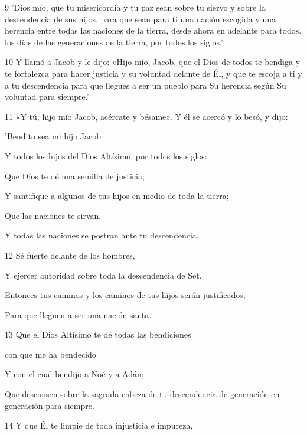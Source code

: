 \par 9 'Dios mío, que tu misericordia y tu paz sean sobre tu siervo y sobre la descendencia de sus hijos, para que sean para ti una nación escogida y una herencia entre todas las naciones de la tierra, desde ahora en adelante para todos. los días de las generaciones de la tierra, por todos los siglos.'
\par 10 Y llamó a Jacob y le dijo: «Hijo mío, Jacob, que el Dios de todos te bendiga y te fortalezca para hacer justicia y su voluntad delante de Él, y que te escoja a ti y a tu descendencia para que llegues a ser un pueblo para Su herencia según Su voluntad para siempre.'
\par 11 «Y tú, hijo mío Jacob, acércate y bésame». Y él se acercó y lo besó, y dijo:
\par    
\par     'Bendito sea mi hijo Jacob  
\par     Y todos los hijos del Dios Altísimo, por todos los siglos:
\par    
\par     Que Dios te dé una semilla de justicia;  
\par     Y santifique a algunos de tus hijos en medio de toda la tierra;
\par    
\par     Que las naciones te sirvan,  
\par     Y todas las naciones se postran ante tu descendencia.
\par    
\par 12 Sé fuerte delante de los hombres,  
\par     Y ejercer autoridad sobre toda la descendencia de Set.
\par    
\par     Entonces tus caminos y los caminos de tus hijos serán justificados,  
\par     Para que lleguen a ser una nación santa.
\par    
\par 13 Que el Dios Altísimo te dé todas las bendiciones  
\par     con que me ha bendecido
\par    
\par     Y con el cual bendijo a Noé y a Adán;  
\par     Que descansen sobre la sagrada cabeza de tu descendencia de generación en generación para siempre.
\par    
\par 14 Y que Él te limpie de toda injusticia e impureza,  
